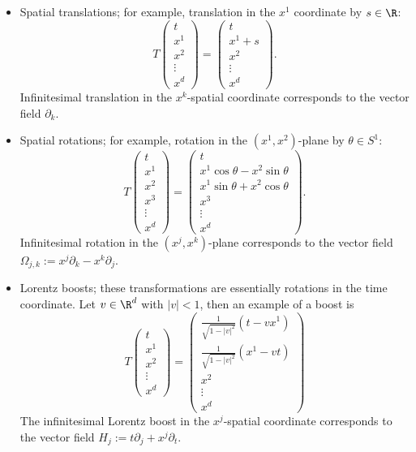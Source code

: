 \documentclass[reqno]{amsart}
\theoremstyle{definition}
\theoremstyle{remark}
\begin{document}
\begin{itemize}
	\item Spatial translations; for example, translation in the $x^1$ coordinate by $s \in \R$:
				\[ T\begin{pmatrix} t \\ x^1 \\ x^2\\ \vdots \\ x^d \end{pmatrix} =  \begin{pmatrix} t \\ x^1 + s \\ x^2 \\ \vdots  \\ x^d \end{pmatrix}.\]
			Infinitesimal translation in the $x^k$-spatial coordinate corresponds to the vector field $\partial_k$. 	
	
	\item Spatial rotations; for example, rotation in the $(x^1, x^2)$-plane by $\theta \in S^1$:
				\[
					T \begin{pmatrix} t \\ x^1 \\ x^2 \\ x^3 \\ \vdots \\ x^d \end{pmatrix}
					=
					\begin{pmatrix} t \\ x^1 \cos \theta  -x^2 \sin \theta  \\ x^1 \sin \theta  +  x^2 \cos \theta  \\  x^3 \\ \vdots \\ x^d \end{pmatrix}.
				\]
			Infinitesimal rotation in the $(x^j, x^k)$-plane corresponds to the vector field $\Omega_{j, k} := x^j \partial_k - x^k \partial_j$. 
	
	\item Lorentz boosts; these transformations are essentially rotations in the time coordinate. Let $v \in \R^d$ with $|v| < 1$, then an example of a boost is
				\[
					T
					\begin{pmatrix} t \\ x^1 \\ x^2 \\ \vdots \\ x^d \end{pmatrix}
					 = \begin{pmatrix} \frac{1}{\sqrt{1 - |v|^2}} (t - v x^1) \\  \frac{1}{\sqrt{1 - |v|^2}} (x^1 - v t) \\ x^2 \\ \vdots \\ x^d \end{pmatrix}
				 \]
			The infinitesimal Lorentz boost in the $x^j$-spatial coordinate corresponds to the vector field $H_j := t \partial_j + x^j \partial_t$. 	 
\end{itemize}
\end{document}
